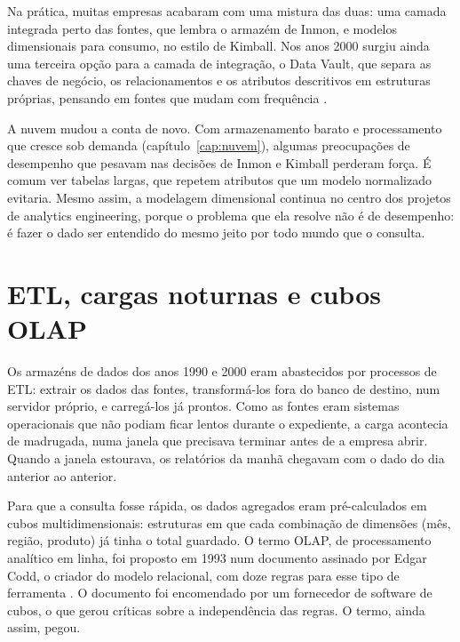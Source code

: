 Na prática, muitas empresas acabaram com uma mistura das duas: uma camada integrada
perto das fontes, que lembra o armazém de Inmon, e modelos dimensionais para consumo,
no estilo de Kimball. Nos anos 2000 surgiu ainda uma terceira opção para a camada de
integração, o Data Vault, que separa as chaves de negócio, os relacionamentos e os
atributos descritivos em estruturas próprias, pensando em fontes que mudam com
frequência \parencite{linstedt2015}.

A nuvem mudou a conta de novo. Com armazenamento barato e processamento que cresce sob
demanda (capítulo~\ref{cap:nuvem}), algumas preocupações de desempenho que pesavam nas
decisões de Inmon e Kimball perderam força. É comum ver tabelas largas, que repetem
atributos que um modelo normalizado evitaria. Mesmo assim, a modelagem dimensional
continua no centro dos projetos de analytics engineering, porque o problema que ela
resolve não é de desempenho: é fazer o dado ser entendido do mesmo jeito por todo mundo
que o consulta.


\section{ETL, cargas noturnas e cubos OLAP}
\label{sec:etl-olap}

Os armazéns de dados dos anos 1990 e 2000 eram abastecidos por processos de ETL:
extrair os dados das fontes, transformá-los fora do banco de destino, num servidor
próprio, e carregá-los já prontos. Como as fontes eram sistemas operacionais que não
podiam ficar lentos durante o expediente, a carga acontecia de madrugada, numa janela
que precisava terminar antes de a empresa abrir. Quando a janela estourava, os
relatórios da manhã chegavam com o dado do dia anterior ao anterior.

Para que a consulta fosse rápida, os dados agregados eram pré-calculados em cubos
multidimensionais: estruturas em que cada combinação de dimensões (mês, região,
produto) já tinha o total guardado. O termo OLAP, de processamento analítico em linha,
foi proposto em 1993 num documento assinado por Edgar Codd, o criador do modelo
relacional, com doze regras para esse tipo de ferramenta \parencite{codd1993}. O
documento foi encomendado por um fornecedor de software de cubos, o que gerou
críticas sobre a independência das regras. O termo, ainda assim, pegou.

